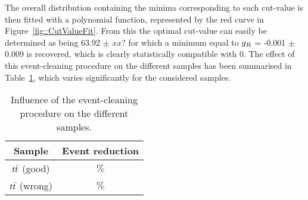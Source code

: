 The overall distribution containing the minima corresponding to each cut-value is then fitted with a polynomial function, represented by the red curve in Figure~\ref{fig::CutValueFit}.
From this the optimal cut-value can easily be determined as being $63.92$ $\pm$ $xx?$ for which a minimum equal to $g_{R}$ = -0.001 $\pm$ 0.009 is recovered, which is clearly statistically compatible with 0.
The effect of this event-cleaning procedure on the different samples has been summarised in Table~\ref{table::CutInfl}, which varies significantly for the considered samples.
\\
\begin{table}[h!t]
 \centering
 \caption{Influence of the event-cleaning procedure on the different samples.} \label{table::CutInfl}
 \renewcommand{\arraystretch}{1.2}
 \begin{tabular}{c|c}
  Sample 		& Event reduction 	\\
  \hline
  $t\bar{t}$ (good)	& $\%$ 			\\
  $t\bar{t}$ (wrong) 	& $\%$ 			\\
 \end{tabular}
\end{table}


